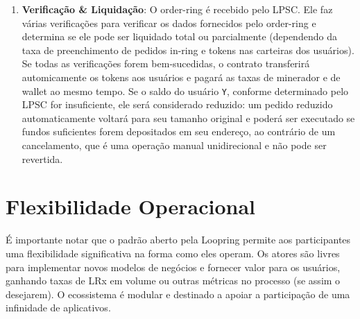 \documentclass[UTF8,nofonts]{article}
\makeatletter
\newenvironment{figurehere}
 {\def\@captype{figure}}
 {}
\makeatother
\begin{document}
\begin{multicols}{2}
\begin{enumerate}
\item \textbf{Verificação \& Liquidação}: O order-ring é recebido pelo LPSC. Ele faz várias verificações para verificar os dados fornecidos pelo order-ring e determina se ele pode ser liquidado total ou parcialmente (dependendo da taxa de preenchimento de pedidos in-ring e tokens nas carteiras dos usuários). Se todas as verificações forem bem-sucedidas, o contrato transferirá automicamente os tokens aos usuários e pagará as taxas de minerador e de wallet ao mesmo tempo. Se o saldo do usuário \verb|Y|, conforme determinado pelo LPSC for insuficiente, ele será considerado reduzido: um pedido reduzido automaticamente voltará para seu tamanho original e poderá ser executado se fundos suficientes forem depositados em seu endereço, ao contrário de um cancelamento, que é uma operação manual unidirecional e não pode ser revertida.


\end{enumerate}





%
%
%

\section{Flexibilidade Operacional\label{sec:business_model}}
É importante notar que o padrão aberto pela Loopring permite aos participantes uma flexibilidade significativa na forma como eles operam. Os atores são livres para implementar novos modelos de negócios e fornecer valor para os usuários, ganhando taxas de LRx em volume ou outras métricas no processo (se assim o desejarem). O ecossistema é modular e destinado a apoiar a participação de uma infinidade de aplicativos.



\end{multicols}
\end{document}
